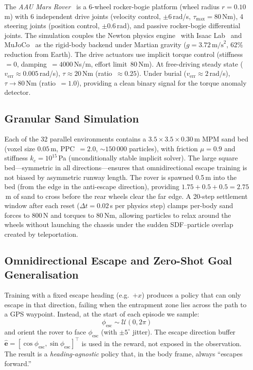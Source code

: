 \documentclass[conference]{IEEEtran}
\begin{document}
The \textit{AAU Mars Rover}~\cite{rlroverlab} is a 6-wheel rocker-bogie platform
(wheel radius $r{=}0.10$\,m) with 6 independent drive joints (velocity control,
$\pm6$\,rad/s, $\tau_{\max}{=}80$\,Nm), 4 steering joints (position control,
$\pm0.6$\,rad), and passive rocker-bogie differential joints. The simulation
couples the Newton physics engine~\cite{newton} with Isaac Lab~\cite{isaaclab}
and MuJoCo~\cite{todorov2012mujoco} as the rigid-body backend under Martian
gravity ($g{=}3.72\,\text{m/s}^2$, 62\% reduction from Earth). The drive actuators use implicit torque control (stiffness~$=0$,
damping~$=4000$\,Ns/m, effort limit~$80$\,Nm). At free-driving steady state
($v_\text{err}{\approx}0.005$\,rad/s), $\tau{\approx}20$\,Nm (ratio~$\approx0.25$).
Under burial ($v_\text{err}{\approx}2$\,rad/s), $\tau\to80$\,Nm (ratio~$=1.0$),
providing a clean binary signal for the torque anomaly detector.

\subsection{Granular Sand Simulation}

Each of the 32 parallel environments contains a $3.5{\times}3.5{\times}0.30$\,m
MPM sand bed (voxel size $0.05$\,m, PPC~$=2.0$, ${\sim}150\,000$ particles),
with friction $\mu{=}0.9$ and stiffness $k_e{=}10^{15}$\,Pa (unconditionally
stable implicit solver). The large square bed---symmetric in all
directions---ensures that omnidirectional escape training is not biased by
asymmetric runway length. The rover is spawned 0.5\,m into the bed (from the
edge in the anti-escape direction), providing $1.75+0.5+0.5{=}2.75$\,m of sand
to cross before the rear wheels clear the far edge. A 20-step settlement window after each reset ($\Delta t{=}0.02$\,s per physics
step) clamps per-body sand forces to 800\,N and torques to 80\,Nm, allowing
particles to relax around the wheels without launching the chassis under the
sudden SDF--particle overlap created by teleportation.

\subsection{Omnidirectional Escape and Zero-Shot Goal Generalisation}

Training with a fixed escape heading (e.g.~$+x$) produces a policy that can
only escape in that direction, failing when the entrapment zone lies across the
path to a GPS waypoint. Instead, at the start of each episode we sample:
\begin{equation}
  \phi_\text{esc} \sim \mathcal{U}(0, 2\pi)
\end{equation}
and orient the rover to face $\phi_\text{esc}$ (with $\pm5^\circ$ jitter). The escape direction buffer $\hat{\mathbf{e}} = [\cos\phi_\text{esc},
\sin\phi_\text{esc}]^\top$ is used in the reward, not exposed in the observation.
The result is a \emph{heading-agnostic} policy that, in the body frame, always
``escapes forward.''
\end{document}
